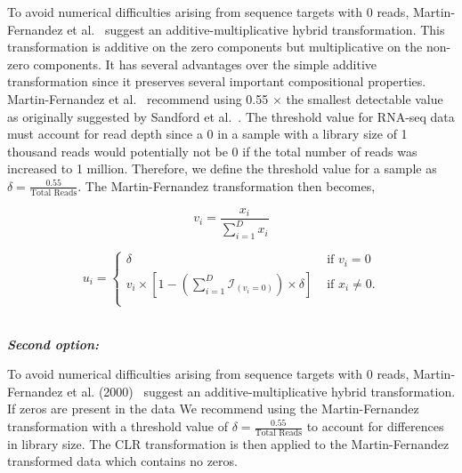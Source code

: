 \documentclass{article}\usepackage[]{graphicx}\usepackage[]{color}
\theoremstyle{definition}
\begin{document}
\colorbox{light-gray}{
\begin{minipage}{\textwidth}
  To avoid numerical difficulties arising from sequence targets with 0 reads, Martin-Fernandez et al.~\cite{Martin-Fernandez2000} suggest an additive-multiplicative hybrid transformation.  This transformation is additive on the zero components but multiplicative on the non-zero components.  It has several advantages over the simple additive transformation since it preserves several important compositional properties.  Martin-Fernandez et al.~\cite{Martin-Fernandez2000} recommend using 0.55 $\times$ the smallest detectable value as originally suggested by Sandford et al.~\cite{Kiers2000, Sanford1993}. The threshold value for RNA-seq data must account for read depth since a 0 in a sample with a library size of 1 thousand reads would potentially not be 0 if the total number of reads was increased to 1 million.  Therefore, we define the threshold value for a sample as $\delta = \frac{0.55}{\text{Total Reads}}$.  The Martin-Fernandez transformation then becomes,
  
  \begin{equation}
  v_i = \frac{x_i}{\sum_{i = 1}^{D} x_i}
  \end{equation}
  
  \begin{equation}
  u_i  = 
  \begin{cases} 
  \delta  & \text{ if }v_i = 0\\
  v_i \times \left[1 - \left( \sum_{i = 1}^{D} \mathcal{I}_{\left(v_i = 0\right)}\right) \times \delta  \right] & \text{ if }x_i \ne 0.\\
  \end{cases}
  \label{MFclr}
  \end{equation}
  
  \end{minipage}
}
\\

\emph{\textbf{Second option:}}

\colorbox{light-gray}{
\begin{minipage}{\textwidth}

To avoid numerical difficulties arising from sequence targets with 0 reads, Martin-Fernandez et al. (2000)~\cite{Martin-Fernandez2000} suggest an additive-multiplicative hybrid transformation.  If zeros are present in the data We recommend using the Martin-Fernandez transformation with a threshold value of $\delta = \frac{0.55}{\text{Total Reads}}$ to account for differences in library size.  The CLR transformation is then applied to the Martin-Fernandez transformed data which contains no zeros. \\

  \end{minipage}
}
\\
\end{document}
